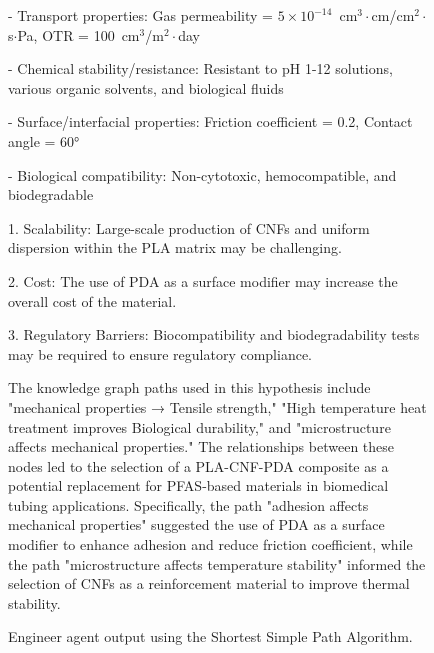 \begin{figure}[t!]
\begin{mdframed}
    - Transport properties: Gas permeability = $5 \times 10^{-14}$~cm$^3\cdot$cm/cm$^2\cdot$s$\cdot$Pa, OTR = 100~cm$^3$/m$^2\cdot$day
    
    - Chemical stability/resistance: Resistant to pH 1-12 solutions, various organic solvents, and biological fluids
    
    - Surface/interfacial properties: Friction coefficient = 0.2, Contact angle = 60°
    
    - Biological compatibility: Non-cytotoxic, hemocompatible, and biodegradable
    
    \textbf{}
    
    1. Scalability: Large-scale production of CNFs and uniform dispersion within the PLA matrix may be challenging. 
    
    2. Cost: The use of PDA as a surface modifier may increase the overall cost of the material. 
    
    3. Regulatory Barriers: Biocompatibility and biodegradability tests may be required to ensure regulatory compliance.
    
    \textbf{}
    
    The knowledge graph paths used in this hypothesis include "mechanical properties → Tensile strength," "High temperature heat treatment improves Biological durability," and "microstructure affects mechanical properties." The relationships between these nodes led to the selection of a PLA-CNF-PDA composite as a potential replacement for PFAS-based materials in biomedical tubing applications. Specifically, the path "adhesion affects mechanical properties" suggested the use of PDA as a surface modifier to enhance adhesion and reduce friction coefficient, while the path "microstructure affects temperature stability" informed the selection of CNFs as a reinforcement material to improve thermal stability.
    
  \end{mdframed}
  \caption{Engineer agent output using the Shortest Simple Path Algorithm.}
  \label{fig:engineer_shortest_path}
\end{figure}

